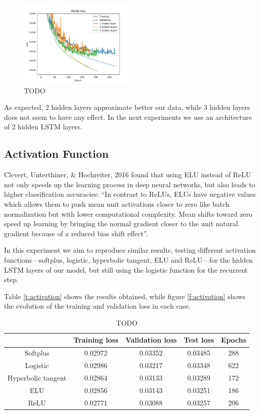 \documentclass[]{article}
\begin{document}
\begin{figure}[H]
	\centering
	\includegraphics[width=0.5\textwidth]{layers}
	\caption{TODO}
	\label{f:layers}
\end{figure}

As expected, 2 hidden layers approximate better our data, while 3 hidden layers does not seem to have any effect. In the next experiments we use an architecture of 2 hidden LSTM layers.

\subsection{Activation Function}

Clevert, Unterthiner, \& Hochreiter, 2016 \cite{clevert2015fast} found that using ELU instead of ReLU not only speeds up the learning process in deep neural networks, but also leads to higher classification accuracies: ``In contrast to ReLUs, ELUs have negative values which allows them to push mean unit activations closer to zero like batch normalization but with lower computational complexity. Mean shifts toward zero speed up learning by bringing the normal gradient closer to the unit natural gradient because of a reduced bias shift effect''.

In this experiment we aim to reproduce similar results, testing different activation functions---softplus, logistic, hyperbolic tangent, ELU and ReLU---for the hidden LSTM layers of our model, but still using the logistic function for the recurrent step.

Table \ref{t:activation} shows the results obtained, while figure \ref{f:activation} shows the evolution of the training and validation loss in each case.

\begin{table}[H]
	\centering
	\begin{tabular}{@{}ccccc@{}}
		\toprule
		& Training loss & Validation loss & Test loss & Epochs \\ \midrule
		Softplus           & 0.02972       & 0.03352         & 0.03485   & 288    \\
		Logistic           & 0.02986       & 0.03217         & 0.03348   & 622    \\
		Hyperbolic tangent & 0.02864       & 0.03133         & 0.03289   & 172    \\
		ELU                & 0.02856       & 0.03143         & 0.03251   & 186    \\
		ReLU               & 0.02771       & 0.03088         & 0.03257   & 206    \\ \bottomrule
	\end{tabular}
	\caption{TODO}
	\label{activation}
\end{table}
\end{document}
